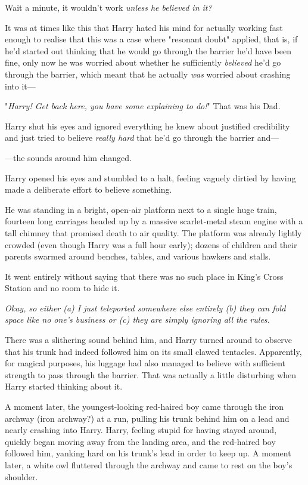 Wait a minute, it wouldn't work \emph{unless he believed in it?}

It was at times like this that Harry hated his mind for actually working fast
enough to realise that this was a case where "resonant doubt" applied, that is,
if he'd started out thinking that he would go through the barrier he'd have
been fine, only now he was worried about whether he sufficiently
\emph{believed} he'd go through the barrier, which meant that he actually
\emph{was} worried about crashing into it---

"\emph{Harry! Get back here, you have some explaining to do!}" That was his Dad.

Harry shut his eyes and ignored everything he knew about justified credibility
and just tried to believe \emph{really hard} that he'd go through the barrier
and---

---the sounds around him changed.

Harry opened his eyes and stumbled to a halt, feeling vaguely dirtied by having
made a deliberate effort to believe something.

He was standing in a bright, open-air platform next to a single huge train,
fourteen long carriages headed up by a massive scarlet-metal steam engine with
a tall chimney that promised death to air quality. The platform was already
lightly crowded (even though Harry was a full hour early); dozens of children
and their parents swarmed around benches, tables, and various hawkers and
stalls.

It went entirely without saying that there was no such place in King's Cross
Station and no room to hide it.

\emph{Okay, so either (a) I just teleported somewhere else entirely (b) they
can fold space like no one's business or (c) they are simply ignoring all the
rules.}

There was a slithering sound behind him, and Harry turned around to observe
that his trunk had indeed followed him on its small clawed tentacles.
Apparently, for magical purposes, his luggage had also managed to believe with
sufficient strength to pass through the barrier. That was actually a little
disturbing when Harry started thinking about it.

A moment later, the youngest-looking red-haired boy came through the iron
archway (iron archway?) at a run, pulling his trunk behind him on a lead and
nearly crashing into Harry. Harry, feeling stupid for having stayed around,
quickly began moving away from the landing area, and the red-haired boy
followed him, yanking hard on his trunk's lead in order to keep up. A moment
later, a white owl fluttered through the archway and came to rest on the boy's
shoulder.

